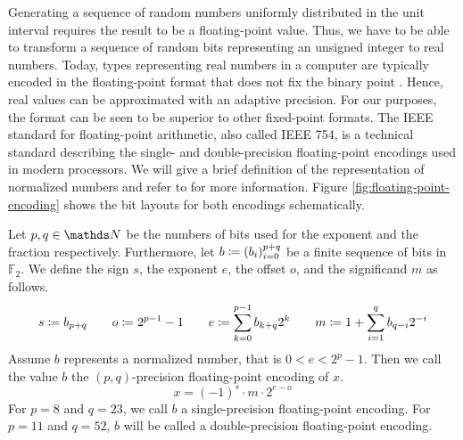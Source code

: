 \documentclass{stdlocal}
\begin{document}
    Generating a sequence of random numbers uniformly distributed in the unit interval requires the result to be a floating-point value.
    Thus, we have to be able to transform a sequence of random bits representing an unsigned integer to real numbers.
    Today, types representing real numbers in a computer are typically encoded in the floating-point format that does not fix the binary point \autocite{patterson2014}.
    Hence, real values can be approximated with an adaptive precision.
    For our purposes, the format can be seen to be superior to other fixed-point formats.
    The IEEE standard for floating-point arithmetic, also called IEEE 754, is a technical standard describing the single- and double-precision floating-point encodings used in modern processors.
    We will give a brief definition of the representation of normalized numbers and refer to \textcite[\ppno~196-220]{patterson2014} for more information.
    Figure \ref{fig:floating-point-encoding} shows the bit layouts for both encodings schematically.

    \begin{definition}
      Let $p,q\in\setNatural$ be the numbers of bits used for the exponent and the fraction respectively.
      Furthermore, let $b\coloneqq (b_i)_{i=0}^{p+q}$ be a finite sequence of bits in $\mathds{F}_2$.
      We define the sign $s$, the exponent $e$, the offset $o$, and the significand $m$ as follows.
      \[
        s \coloneqq b_{p+q}
        \qquad
        o \coloneqq 2^{p-1} - 1
        \qquad
        e \coloneqq \sum_{k=0}^{p-1} b_{k+q} 2^{k}
        \qquad
        m \coloneqq 1 + \sum_{i=1}^{q} b_{q-i} 2^{-i}
      \]
      Assume $b$ represents a normalized number, that is $0 < e < 2^p - 1$.
      Then we call the value $b$ the $(p,q)$-precision floating-point encoding of $x$.
      \[
        x = (-1)^s \cdot m \cdot 2^{e-o}
      \]
      For $p=8$ and $q = 23$, we call $b$ a single-precision floating-point encoding.
      For $p=11$ and $q = 52$, $b$ will be called a double-precision floating-point encoding.
    \end{definition}
\end{document}

